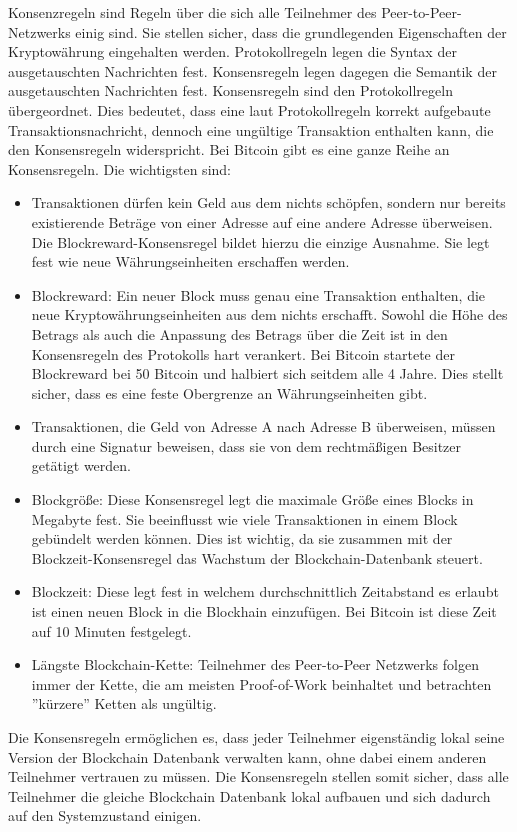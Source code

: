 Konsenzregeln sind Regeln über die sich alle Teilnehmer des Peer-to-Peer-Netzwerks einig sind. Sie stellen sicher, dass die grundlegenden Eigenschaften der Kryptowährung eingehalten werden. 
\if
Protokollregeln legen die Syntax der ausgetauschten Nachrichten fest. Konsensregeln legen dagegen die Semantik der ausgetauschten Nachrichten fest. 
Konsensregeln sind den Protokollregeln übergeordnet. Dies bedeutet, dass eine laut Protokollregeln korrekt aufgebaute Transaktionsnachricht, dennoch eine ungültige Transaktion enthalten kann, die den Konsensregeln widerspricht.
\fi
Bei Bitcoin gibt es eine ganze Reihe an Konsensregeln. Die wichtigsten sind:
\begin{itemize}
\item Transaktionen dürfen kein Geld aus dem nichts schöpfen, sondern nur bereits existierende Beträge von einer Adresse auf eine andere Adresse überweisen. Die Blockreward-Konsensregel bildet hierzu die einzige Ausnahme. Sie legt fest wie neue Währungseinheiten erschaffen werden.
\item Blockreward: Ein neuer Block muss genau eine Transaktion enthalten, die neue Kryptowährungseinheiten aus dem nichts erschafft. Sowohl die Höhe des Betrags als auch die Anpassung des Betrags über die Zeit ist in den Konsensregeln des Protokolls hart verankert. Bei Bitcoin startete der Blockreward bei 50 Bitcoin und halbiert sich seitdem alle 4 Jahre. Dies stellt sicher, dass es eine feste Obergrenze an Währungseinheiten gibt.
\item Transaktionen, die Geld von Adresse A nach Adresse B überweisen, müssen durch eine Signatur beweisen, dass sie von dem rechtmäßigen Besitzer getätigt werden.
\item Blockgröße: Diese Konsensregel legt die maximale Größe eines Blocks in Megabyte fest. Sie beeinflusst wie viele Transaktionen in einem Block gebündelt werden können. Dies ist wichtig, da sie zusammen mit der Blockzeit-Konsensregel das Wachstum der Blockchain-Datenbank steuert.
\item Blockzeit: Diese legt fest in welchem durchschnittlich Zeitabstand es erlaubt ist einen neuen Block in die Blockhain einzufügen. Bei Bitcoin ist diese Zeit auf 10 Minuten festgelegt.
\item Längste Blockchain-Kette: Teilnehmer des Peer-to-Peer Netzwerks folgen immer der Kette, die am meisten Proof-of-Work beinhaltet und betrachten ''kürzere'' Ketten als ungültig.
\end{itemize}
Die Konsensregeln ermöglichen es, dass jeder Teilnehmer eigenständig lokal seine Version der Blockchain Datenbank verwalten kann, ohne dabei einem anderen Teilnehmer vertrauen zu müssen. Die Konsensregeln stellen somit sicher, dass alle Teilnehmer die gleiche Blockchain Datenbank lokal aufbauen und sich dadurch auf den Systemzustand einigen.

